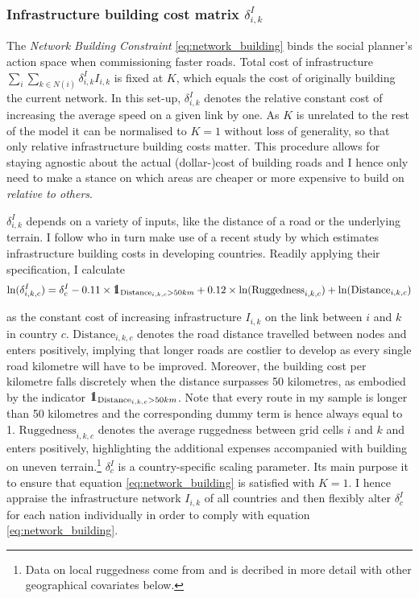 \documentclass[11pt, oneside]{article}   	%
\def\one{\mbox{1\hspace{-4.25pt}\fontsize{12}{14.4}\selectfont\textrm{1}}} %
\begin{document}
\subsubsection{Infrastructure building cost matrix $\delta_{i,k}^{I}$}
The \emph{Network Building Constraint} \eqref{eq:network_building} binds the social planner's action space when commissioning faster roads. Total cost of infrastructure $\sum_{i}^{}\sum_{k \in N(i)}^{} \delta_{i,k}^{I}I_{i,k}$ is fixed at $K$, which equals the cost of originally building the current network. In this set-up, $\delta_{i,k}^{I}$ denotes the relative constant cost of increasing the average speed on a given link by one. As $K$ is unrelated to the rest of the model it can be normalised to $K=1$ without loss of generality, so that only relative infrastructure building costs matter. This procedure allows for staying agnostic about the actual (dollar-)cost of building roads and I hence only need to make a stance on which areas are cheaper or more expensive to build on \emph{relative to others}.

$\delta_{i,k}^{I}$ depends on a variety of inputs, like the distance of a road or the underlying terrain. I follow \citeauthor{fajgelbaum_optimal_2017} who in turn make use of a recent study by \cite{collier_cost_2015} which estimates infrastructure building costs in developing countries. Readily applying their specification, I calculate
\begin{equation}
  \textrm{ln}(\delta^{I}_{i,k,c}) = \delta_{c}^{I} - 0.11 \times \one_{\textrm{Distance}_{i,k,c} > 50km} + 0.12 \times \textrm{ln}(\textrm{Ruggedness}_{i,k,c}) + \textrm{ln}(\textrm{Distance}_{i,k,c})
  \label{eq:delta_I}
\end{equation}

as the constant cost of increasing infrastructure $I_{i,k}$ on the link between $i$ and $k$ in country $c$. $\textrm{Distance}_{i,k,c}$ denotes the road distance travelled between nodes and enters positively, implying that longer roads are costlier to develop as every single road kilometre will have to be improved. Moreover, the building cost per kilometre falls discretely when the distance surpasses 50 kilometres, as embodied by the indicator $\one_{\textrm{Distance}_{i,k,c} > 50km}$. Note that every route in my sample is longer than 50 kilometres and the corresponding dummy term is hence always equal to 1. $\textrm{Ruggedness}_{i,k,c}$ denotes the average ruggedness between grid cells $i$ and $k$ and enters positively, highlighting the additional expenses accompanied with building on uneven terrain.\footnote{Data on local ruggedness come from \cite{henderson_global_2018} and is decribed in more detail with other geographical covariates below.} $\delta_{c}^{I}$ is a country-specific scaling parameter. Its main purpose it to ensure that equation \eqref{eq:network_building} is satisfied with $K=1$. I hence appraise the infrastructure network $I_{i,k}$ of all countries and then flexibly alter $\delta_{c}^{I}$ for each nation individually in order to comply with equation \eqref{eq:network_building}.
\end{document}
